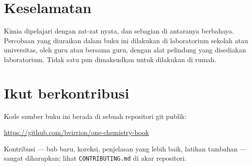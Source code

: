 \section*{Keselamatan}

Kimia dipelajari dengan zat-zat nyata, dan sebagian di antaranya
berbahaya. Percobaan yang diuraikan dalam buku ini dilakukan di
laboratorium sekolah atau universitas, oleh guru atau bersama guru,
dengan alat pelindung yang disediakan laboratorium. Tidak satu pun
dimaksudkan untuk dilakukan di rumah.

\section*{Ikut berkontribusi}

Kode sumber buku ini berada di sebuah repositori git publik:
\begin{center}
\url{https://github.com/bvirrion/one-chemistry-book}
\end{center}
Kontribusi --- bab baru, koreksi, penjelasan yang lebih baik, latihan
tambahan --- sangat diharapkan; lihat \texttt{CONTRIBUTING.md} di akar
repositori.
